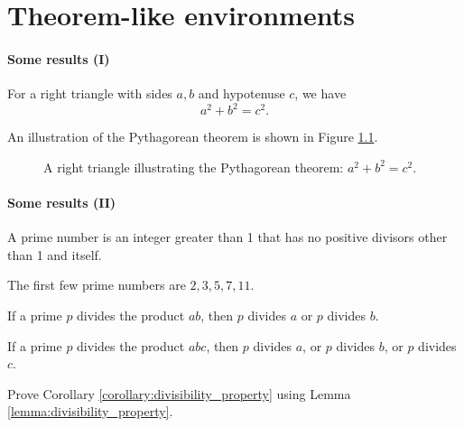 \setcounter{chapter}{2}
\chapter{Theorem-like environments}
\label{chap:theorem_envs}

\begin{frame}
\frametitle{Some results (I)}
\begin{theorem}[Pythagoras]
For a right triangle with sides $a, b$ and hypotenuse $c$, we have
\[
a^2 + b^2 = c^2.
\]
\end{theorem}

An illustration of the Pythagorean theorem is shown in Figure \ref{fig:pythagorean}.

\begin{figure}
\centering
{}
\caption{A right triangle illustrating the Pythagorean theorem: $a^2 + b^2 = c^2$.}
\label{fig:pythagorean}
\end{figure}

\end{frame}

\begin{frame}
\frametitle{Some results (II)}
\begin{definition}
A prime number is an integer greater than 1 that has no positive divisors other than 1 and itself.
\end{definition}

\begin{example}
The first few prime numbers are $2, 3, 5, 7, 11$.
\end{example}

\begin{lemma}
If a prime $p$ divides the product $ab$, then $p$ divides $a$ or $p$ divides $b$.
\label{lemma:divisibility_property}
\end{lemma}

\begin{corollary}
If a prime $p$ divides the product $abc$, then $p$ divides $a$, or $p$ divides $b$, or $p$ divides $c$.
\label{corollary:divisibility_property}
\end{corollary}

\begin{exercise}
Prove Corollary \ref{corollary:divisibility_property} using Lemma \ref{lemma:divisibility_property}.
\end{exercise}

\end{frame}

